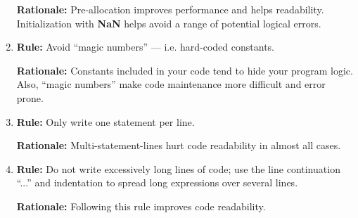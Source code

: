 \documentclass{tufte-book}
\theoremstyle{break}
\begin{document}
\begin{enumerate}
\textbf{Rationale:} Pre-allocation improves performance and helps readability. Initialization with \textbf{NaN} helps avoid a range of potential logical errors.

\item \textbf{Rule:} Avoid ``magic numbers'' --- i.e. hard-coded constants.

\textbf{Rationale:} Constants included in your code tend to hide your program logic. Also, ``magic numbers'' make code maintenance more difficult and error prone.

\item \textbf{Rule:} Only write one statement per line.

\textbf{Rationale:} Multi-statement-lines hurt code readability in almost all cases.

\item \textbf{Rule:} Do not write excessively long lines of code; use the line continuation ``...'' and indentation to spread long expressions over several lines.

\textbf{Rationale:} Following this rule improves code readability.
\end{enumerate}


\printindex
\end{document}
